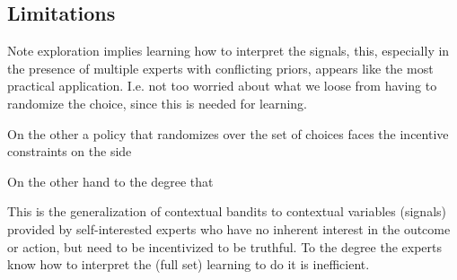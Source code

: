 



\subsection{Limitations}


Note exploration implies learning how to interpret the signals, this, especially in the presence of multiple experts with conflicting priors, appears like the most practical application. I.e. not too worried about what we loose from having to randomize the choice, since this is needed for learning. 

On the other a policy that randomizes over the set of choices faces the incentive constraints on the side 

On the other hand to the degree that 


This is the generalization of contextual bandits to contextual variables (signals) provided by self-interested experts who have no inherent interest in the outcome or action, but need to be incentivized to be truthful. 
To the degree the experts know how to interpret the (full set) learning to do it is inefficient. 











